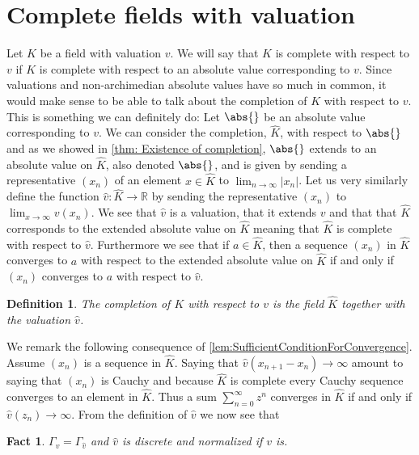 \documentclass{article}
\newtheorem{definition}{Definition}[section]
\newtheorem{fact}{Fact}[section]
\newcommand{\mbb}[1]{\mathbb{#1}}
\numberwithin{equation}{section}
\begin{document}
\section{Complete fields with valuation}
Let $K$ be a field with valuation $v$. We will say that $K$ is complete with respect to $v$ if $K$ is complete with respect to an absolute value corresponding to $v$. Since valuations and non-archimedian absolute values have so much in common, it would make sense to be able to talk about the completion of $K$ with respect to $v$. This is something we can definitely do: Let $\abs{}$ be an absolute value corresponding to $v$. We can consider the completion, $\hat K$, with respect to $\abs{}$ and as we showed in \cref{thm: Existence of completion}, $\abs{}$ extends to an absolute value on $\hat K$, also denoted $\abs{}$, and is given by sending a representative $(x_n)$ of an element $x \in \hat K$ to $\lim_{n \to \infty} |x_n|$. Let us very similarly define the function $\hat v : \hat K \to \mbb R$ by sending the representative $(x_n)$ to $\lim_{x \to \infty} v(x_n)$. We see that $\hat v$ is a valuation, that it extends $v$ and that that $\hat K$ corresponds to the extended absolute value on $\hat K$ meaning that $\hat K$ is complete with respect to $\hat v$. Furthermore we see that if $a \in \hat K$, then a sequence $(x_n)$ in $\hat K$ converges to $a$ with respect to the extended absolute value on $\hat K$ if and only if $(x_n)$ converges to $a$ with respect to $\hat v$. 
\begin{definition}
    The completion of $K$ with respect to $v$ is the field $\hat K$ together with the valuation $\hat v$.
\end{definition}
We remark the following consequence of \cref{lem:SufficientConditionForConvergence}. Assume $(x_n)$ is a sequence in $\hat K$. Saying that $\hat v (x_{n+1} - x_n) \to \infty$ amount to saying that $(x_n)$ is Cauchy and because $\hat K$ is complete every Cauchy sequence converges to an element in $\hat K$. Thus a sum $\sum_{n = 0}^\infty z^n$ converges in $\hat K$ if and only if $\hat v(z_n) \to \infty$. From the definition of $\hat v$ we now see that
\begin{fact}\label{K and completion of K have same value group}
    $\Gamma_v = \Gamma_{\hat v}$ and $\hat v$ is discrete and normalized if $v$ is.
\end{fact}
\end{document}
